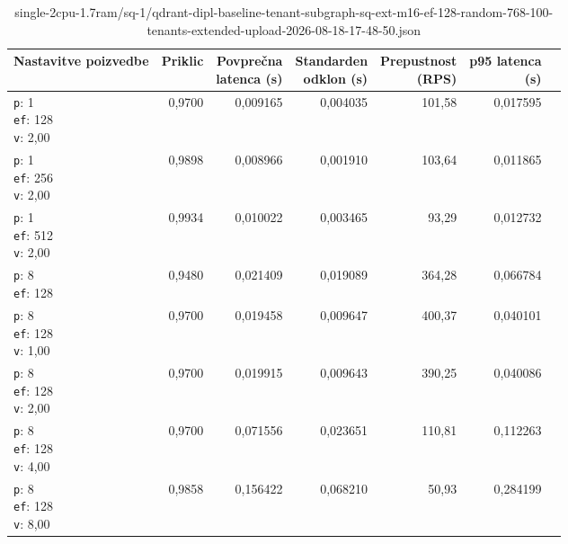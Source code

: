 \begin{table}[htbp]
  \centering
\small
  \caption{single-2cpu-1.7ram/sq-1/qdrant-dipl-baseline-tenant-subgraph-sq-ext-m16-ef-128-random-768-100-tenants-extended-upload-2026-08-18-17-48-50.json}
  \label{tab:single-2cpu-1.7ram:sq-1:qdrant-dipl-baseline-tenant-subgraph-sq-ext-m16-ef-128-random-768-100-tenants-extended-upload-2026-08-18-17-48-50.json}
  \begin{tabularx}{\textwidth}{Xrrrrrr}
    \toprule
    Nastavitve poizvedbe & Priklic & \makecell{Povprečna\\latenca (s)} & \makecell{Standarden\\odklon (s)} & \makecell{Prepustnost\\(RPS)} & \makecell{p95 latenca\\(s)}  \\
    \midrule
    \makecell{\texttt{p}: 1\\\texttt{ef}: 128\\\texttt{v}: 2,00} & 0,9700 & 0,009165 & 0,004035 & 101,58 & 0,017595 \\
    \makecell{\texttt{p}: 1\\\texttt{ef}: 256\\\texttt{v}: 2,00} & 0,9898 & 0,008966 & 0,001910 & 103,64 & 0,011865 \\
    \makecell{\texttt{p}: 1\\\texttt{ef}: 512\\\texttt{v}: 2,00} & 0,9934 & 0,010022 & 0,003465 & 93,29 & 0,012732 \\
    \makecell{\texttt{p}: 8\\\texttt{ef}: 128} & 0,9480 & 0,021409 & 0,019089 & 364,28 & 0,066784 \\
    \makecell{\texttt{p}: 8\\\texttt{ef}: 128\\\texttt{v}: 1,00} & 0,9700 & 0,019458 & 0,009647 & 400,37 & 0,040101 \\
    \makecell{\texttt{p}: 8\\\texttt{ef}: 128\\\texttt{v}: 2,00} & 0,9700 & 0,019915 & 0,009643 & 390,25 & 0,040086 \\
    \makecell{\texttt{p}: 8\\\texttt{ef}: 128\\\texttt{v}: 4,00} & 0,9700 & 0,071556 & 0,023651 & 110,81 & 0,112263 \\
    \makecell{\texttt{p}: 8\\\texttt{ef}: 128\\\texttt{v}: 8,00} & 0,9858 & 0,156422 & 0,068210 & 50,93 & 0,284199 \\

\end{tabularx}
\end{table}
